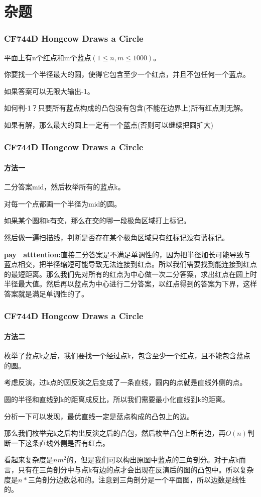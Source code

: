 \section{杂题}

\begin{frame}
\frametitle{CF744D Hongcow Draws a Circle}
\pause
平面上有n个红点和m个蓝点$(1 \le n,m \le 1000)$。

你要找一个半径最大的圆，使得它包含至少一个红点，并且不包任何一个蓝点。

如果答案可以无限大输出-1。

\pause
如何判-1？只要所有蓝点构成的凸包没有包含(不能在边界上)所有红点则无解。

\pause
如果有解，那么最大的圆上一定有一个蓝点(否则可以继续把圆扩大)
\end{frame}

\begin{frame}
\frametitle{CF744D Hongcow Draws a Circle}
\framesubtitle{方法一}
\pause
二分答案mid，然后枚举所有的蓝点k。

对每一个点都画一个半径为mid的圆。

如果某个圆和k有交，那么在交的哪一段极角区域打上标记。

然后做一遍扫描线，判断是否存在某个极角区域只有红标记没有蓝标记。

\textbf{pay \ atttention:}直接二分答案是不满足单调性的，因为把半径加长可能导致与蓝点相交，把半径缩短可能导致无法连接到红点。所以我们需要找到能连接到红点的最短距离。那么我们先对所有的红点为中心做一次二分答案，求出红点在圆上时半径最大值。然后再以蓝点为中心进行二分答案，以红点得到的答案为下界，这样答案就是满足单调性的了。
\end{frame}

\begin{frame}
\frametitle{CF744D Hongcow Draws a Circle}
\framesubtitle{方法二}
\pause
枚举了蓝点k之后，我们要找一个经过点k，包含至少一个红点，且不能包含蓝点的圆。

考虑反演，过k点的圆反演之后变成了一条直线，圆内的点就是直线外侧的点。

圆的半径和直线到k的距离成反比，所以我们需要最小化直线到k的距离。

\pause
分析一下可以发现，最优直线一定是蓝点构成的凸包上的边。

那么我们枚举完k之后构出反演之后的凸包，然后枚举凸包上所有边，再$O(n)$判断一下这条直线外侧是否有红点。

看起来复杂度是$nm^2$的，但是我们可以构出原图中蓝点的三角剖分。对于点k而言，只有在三角剖分中与点k有边的点才会出现在反演后的图的凸包中。所以复杂度是$n*$三角剖分边数总和的。注意到三角剖分是一个平面图，所以边数是线性的。
\end{frame}


